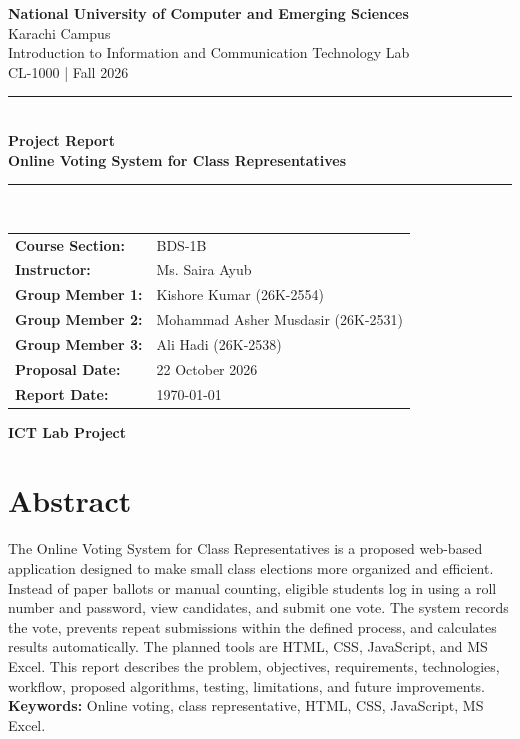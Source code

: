 \documentclass[12pt,a4paper]{report}
\begin{document}
\begin{titlepage}\centering
\vspace*{1cm}
{\Large\textbf{National University of Computer and Emerging Sciences}}\\[0.3cm]
{\large Karachi Campus}\\[0.8cm]
{\large Introduction to Information and Communication Technology Lab}\\
{\large CL-1000 \;|\; Fall 2026}\\[1.2cm]
\rule{\textwidth}{1.2pt}\\[0.4cm]
{\Huge\textbf{Project Report}}\\[0.3cm]
{\LARGE\textbf{Online Voting System for Class Representatives}}\\[0.4cm]
\rule{\textwidth}{1.2pt}\\[1.2cm]
\begin{tabular}{>{\bfseries}p{4cm}p{8cm}}
Course Section: & BDS-1B\\
Instructor: & Ms. Saira Ayub\\
Group Member 1: & Kishore Kumar (26K-2554)\\
Group Member 2: & Mohammad Asher Musdasir (26K-2531)\\
Group Member 3: & Ali Hadi (26K-2538)\\
Proposal Date: & 22 October 2026\\
Report Date: & \today
\end{tabular}
\vfill{\large\textbf{ICT Lab Project}}
\end{titlepage}
\tableofcontents\listoffigures\clearpage{}

\chapter*{Abstract}
The Online Voting System for Class Representatives is a proposed web-based application designed to make small class elections more organized and efficient. Instead of paper ballots or manual counting, eligible students log in using a roll number and password, view candidates, and submit one vote. The system records the vote, prevents repeat submissions within the defined process, and calculates results automatically. The planned tools are HTML, CSS, JavaScript, and MS Excel. This report describes the problem, objectives, requirements, technologies, workflow, proposed algorithms, testing, limitations, and future improvements.
\textbf{Keywords:} Online voting, class representative, HTML, CSS, JavaScript, MS Excel.
\end{document}
